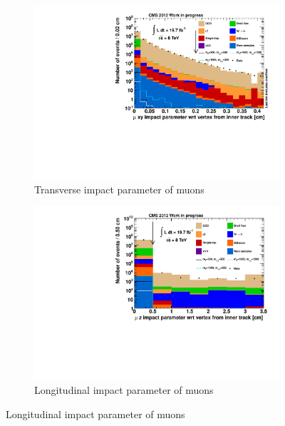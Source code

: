 \begin{figure}[!htbp]
  \ContinuedFloat
  \centering
  \begin{subfigure}[b]{0.495\textwidth}
    \centering
    \includegraphics[width=\textwidth]{plots/nMuon_d0Tk.pdf}
    \caption{Transverse impact parameter of muons\label{fig:muo_d0}}
  \end{subfigure}
  \begin{subfigure}[b]{0.495\textwidth}
    \centering
    \includegraphics[width=\textwidth]{plots/nMuon_dzTk.pdf}
    \caption{Longitudinal impact parameter of muons\label{fig:muo_dz}}
  \end{subfigure}
\end{figure}

